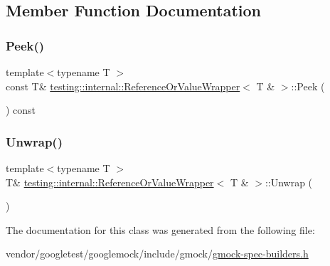 \subsection{Member Function Documentation}
\mbox{\label{classtesting_1_1internal_1_1_reference_or_value_wrapper_3_01_t_01_6_01_4_a2a4ad5debafad859d2ad51ba8473c92a}} 
\subsubsection{\texorpdfstring{Peek()}{Peek()}}
{\footnotesize\ttfamily template$<$typename T $>$ \\
const T\& \hyperlink{classtesting_1_1internal_1_1_reference_or_value_wrapper}{testing\+::internal\+::\+Reference\+Or\+Value\+Wrapper}$<$ T \& $>$\+::Peek (\begin{DoxyParamCaption}{ }\end{DoxyParamCaption}) const\hspace{0.3cm}{\ttfamily [inline]}}

\mbox{\label{classtesting_1_1internal_1_1_reference_or_value_wrapper_3_01_t_01_6_01_4_a0b95dd4e20f237aee89864507172706e}} 
\subsubsection{\texorpdfstring{Unwrap()}{Unwrap()}}
{\footnotesize\ttfamily template$<$typename T $>$ \\
T\& \hyperlink{classtesting_1_1internal_1_1_reference_or_value_wrapper}{testing\+::internal\+::\+Reference\+Or\+Value\+Wrapper}$<$ T \& $>$\+::Unwrap (\begin{DoxyParamCaption}{ }\end{DoxyParamCaption})\hspace{0.3cm}{\ttfamily [inline]}}



The documentation for this class was generated from the following file\+:\begin{DoxyCompactItemize}
\item 
vendor/googletest/googlemock/include/gmock/\hyperlink{gmock-spec-builders_8h}{gmock-\/spec-\/builders.\+h}\end{DoxyCompactItemize}
